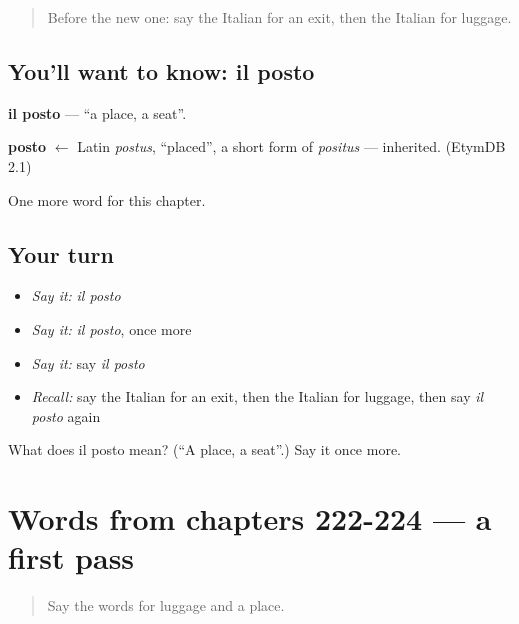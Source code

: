 \begin{quote}
Before the new one: say the Italian for an exit, then the Italian for luggage.
\end{quote}

\subsection*{You'll want to know: il posto}
\textbf{il posto} — \textquotedblleft{}a place, a seat\textquotedblright{}.

\begin{cousinweb}
\textbf{posto} $\leftarrow$ Latin \emph{postus}, \textquotedblleft{}placed\textquotedblright{}, a short form of \emph{positus} — inherited. (EtymDB 2.1)
\end{cousinweb}

\begin{grammarlens}[title={What you've built}]
One more word for this chapter.
\end{grammarlens}

\subsection*{Your turn}
\begin{itemize}
\raggedright
  \item \emph{Say it:} \emph{il posto}
  \item \emph{Say it:} \emph{il posto}, once more
  \item \emph{Say it:} say \emph{il posto}
  \item \emph{Recall:} say the Italian for an exit, then the Italian for luggage, then say \emph{il posto} again
\end{itemize}

\begin{tcolorbox}[breakable,colback=teal!4,colframe=teal!35!black,title={Before you move on}]
What does il posto mean? (\textquotedblleft{}A place, a seat\textquotedblright{}.) Say it once more.
\end{tcolorbox}
\section[(dialogue)]{Words from chapters 222-224 — a first pass}

\label{lesson:IT-R227-first-pass-words-from-chapters-222-224}



\begin{quote}
Say the words for luggage and a place.
\end{quote}

